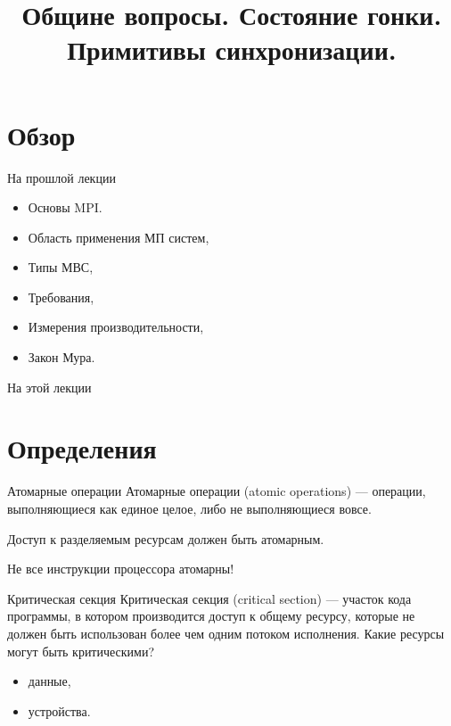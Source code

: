 

\title{Общине вопросы. Состояние гонки. Примитивы синхронизации.}



\begin{frame}
\titlepage
\end{frame}

\section*{Обзор}
\begin{frame}{На прошлой лекции}

\begin{itemize}
\ifmipt
    \item Основы MPI.
\fi
\ifsbertech
    \item Область применения МП систем,
    \item Типы МВС,
    \item Требования,
    \item Измерения производительности,
    \item Закон Мура.
\fi
\end{itemize}
\end{frame}

\begin{frame}{На этой лекции}
\tableofcontents
\end{frame}

\section{Определения}

\begin{frame}{Атомарные операции}
Атомарные операции (\abbr atomic operations) --- операции, выполняющиеся как
единое целое, либо не выполняющиеся вовсе.
\vspace*{0.5cm}

Доступ к разделяемым ресурсам должен быть атомарным.
\vspace*{0.5cm}

Не все инструкции процессора атомарны!
\end{frame}

\begin{frame}{Критическая секция}
Критическая секция (\abbr critical section) --- участок кода программы, в
котором производится доступ к общему ресурсу, которые не должен быть использован
более чем одним потоком исполнения.
\vfill\pause
Какие ресурсы могут быть критическими?
\pause
\begin{itemize}
    \item данные,
    \pause
    \item устройства.
\end{itemize}
\end{frame}

